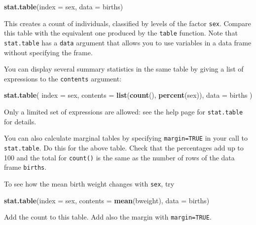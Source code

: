 \documentclass[
]{book}
\newenvironment{Shaded}{\begin{snugshade}}{\end{snugshade}}
\newcommand{\AttributeTok}[1]{\textcolor[rgb]{0.13,0.29,0.53}{#1}}
\newcommand{\FunctionTok}[1]{\textcolor[rgb]{0.13,0.29,0.53}{\textbf{#1}}}
\newcommand{\NormalTok}[1]{#1}
\begin{document}
\begin{Shaded}
\begin{Highlighting}[]
\FunctionTok{stat.table}\NormalTok{(}\AttributeTok{index =}\NormalTok{ sex, }\AttributeTok{data =}\NormalTok{ births)}
\end{Highlighting}
\end{Shaded}

This creates a count of individuals, classified by levels of the
factor \texttt{sex}. Compare this table with the equivalent one produced
by the \texttt{table} function. Note that \texttt{stat.table} has a
\texttt{data} argument that allows you to use variables in a data frame without
specifying the frame.

You can display several summary statistics in the same table by
giving a list of expressions to the \texttt{contents} argument:

\begin{Shaded}
\begin{Highlighting}[]
\FunctionTok{stat.table}\NormalTok{(}
  \AttributeTok{index =}\NormalTok{ sex, }
  \AttributeTok{contents =} \FunctionTok{list}\NormalTok{(}\FunctionTok{count}\NormalTok{(), }\FunctionTok{percent}\NormalTok{(sex)), }
  \AttributeTok{data =}\NormalTok{ births}
\NormalTok{)}
\end{Highlighting}
\end{Shaded}

Only a limited set of expressions are allowed: see the help page
for \texttt{stat.table} for details.

You can also calculate marginal tables by specifying \texttt{margin=TRUE}
in your call to \texttt{stat.table}. Do this for the above table. Check
that the percentages add up to 100 and the total for \texttt{count()} is the
same as the number of rows of the data frame \texttt{births}.

To see how the mean birth weight changes with \texttt{sex}, try

\begin{Shaded}
\begin{Highlighting}[]
\FunctionTok{stat.table}\NormalTok{(}\AttributeTok{index =}\NormalTok{ sex, }\AttributeTok{contents =} \FunctionTok{mean}\NormalTok{(bweight), }\AttributeTok{data =}\NormalTok{ births)}
\end{Highlighting}
\end{Shaded}

Add the count to this table. Add also the margin with \texttt{margin=TRUE}.
\end{document}
